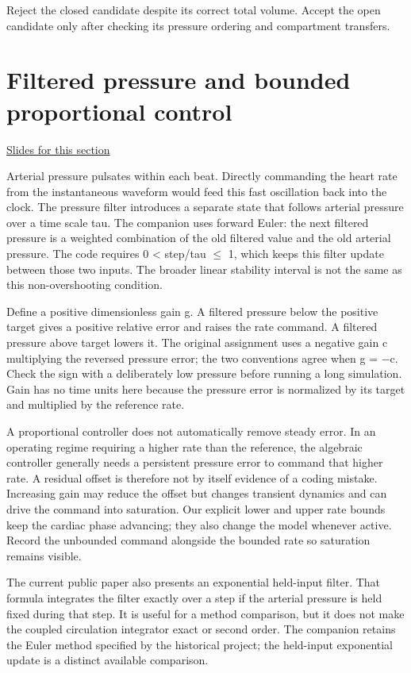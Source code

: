 \documentclass[11pt,letterpaper]{article}
\theoremstyle{definition}\newtheorem{definition}{Definition}\newtheorem{example}{Example}
\numberwithin{equation}{section}
\begin{document}
Reject the closed candidate despite its correct total volume. Accept the open candidate only after checking its pressure ordering and compartment transfers.
\section{Filtered pressure and bounded proportional control}
\hypertarget{note-filtered-pressure-and-bounded-proportional-control}{}\label{note:filtered-pressure-and-bounded-proportional-control}
{\small \href{slides.html\#frame=filter-the-arterial-pressure\&step=1}{Slides for this section}}\par
Arterial pressure pulsates within each beat. Directly commanding the heart rate from the instantaneous waveform would feed this fast oscillation back into the clock. The pressure filter introduces a separate state that follows arterial pressure over a time scale tau. The companion uses forward Euler: the next filtered pressure is a weighted combination of the old filtered value and the old arterial pressure. The code requires 0 < step/tau \ensuremath{\le} 1, which keeps this filter update between those two inputs. The broader linear stability interval is not the same as this non-overshooting condition.

Define a positive dimensionless gain g. A filtered pressure below the positive target gives a positive relative error and raises the rate command. A filtered pressure above target lowers it. The original assignment uses a negative gain c multiplying the reversed pressure error; the two conventions agree when g = \ensuremath{-}c. Check the sign with a deliberately low pressure before running a long simulation. Gain has no time units here because the pressure error is normalized by its target and multiplied by the reference rate.

A proportional controller does not automatically remove steady error. In an operating regime requiring a higher rate than the reference, the algebraic controller generally needs a persistent pressure error to command that higher rate. A residual offset is therefore not by itself evidence of a coding mistake. Increasing gain may reduce the offset but changes transient dynamics and can drive the command into saturation. Our explicit lower and upper rate bounds keep the cardiac phase advancing; they also change the model whenever active. Record the unbounded command alongside the bounded rate so saturation remains visible.

The current public paper also presents an exponential held-input filter. That formula integrates the filter exactly over a step if the arterial pressure is held fixed during that step. It is useful for a method comparison, but it does not make the coupled circulation integrator exact or second order. The companion retains the Euler method specified by the historical project; the held-input exponential update is a distinct available comparison.
\end{document}
